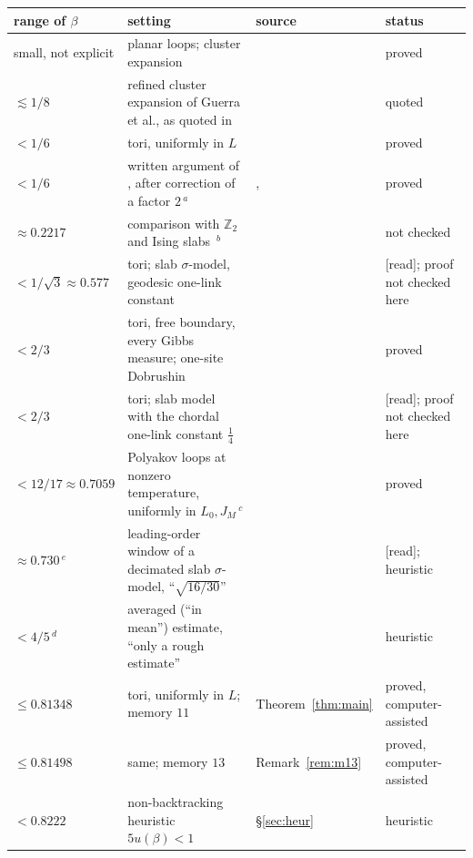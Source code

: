 \documentclass[11pt,a4paper]{article}
\theoremstyle{plain}
\theoremstyle{remark}
\numberwithin{equation}{section}
\newcommand{\Z}{\mathbb{Z}}
\newcommand{\st}[1]{\textsf{[#1]}}
\begin{document}
\begin{table}[ht]
\centering\footnotesize
\begin{tabular}{@{}>{\raggedright\arraybackslash}p{}>{\raggedright\arraybackslash}p{}%
>{\raggedright\arraybackslash}p{}>{\raggedright\arraybackslash}p{}@{}}
\toprule
range of $\beta$ & setting & source & status \\
\midrule
small, not explicit & planar loops; cluster expansion & \cite[Thm.~5.1]{OS78} & proved \\
$\lesssim1/8$ & refined cluster expansion of Guerra et al., as quoted in \cite{BS83} & \cite[p.~343]{BS83} & quoted \\
$<1/6$ & tori, uniformly in $L$ & \cite[Thm.~1.6]{CNS25} & proved \\
$<1/6$ & written argument of \cite{DF80}, after correction of a factor $2$\,$^{a}$ & \cite{DF80}, \cite[\S7.2]{D7} & proved \\
$\approx0.2217$ & comparison with $\Z_2$ and Ising slabs \cite{Fro79}\,$^{b}$ & \cite[\S7.2]{D7} & not checked \\
$<1/\sqrt3\approx0.577$ & tori; slab $\sigma$-model, geodesic one-link constant & \cite[Part~I, Cor.~6.5]{Raj26a} & \st{read}; proof not checked here \\
$<2/3$ & tori, free boundary, every Gibbs measure; one-site Dobrushin & \cite[Thm.~7.1]{D7} & proved \\
$<2/3$ & tori; slab model with the chordal one-link constant $\frac14$ & \cite[Part~II, Cor.~7.7(iii)]{Raj26a} & \st{read}; proof not checked here \\
$<12/17\approx0.7059$ & Polyakov loops at nonzero temperature, uniformly in $L_0,J_M$\,$^{c}$ & \cite[(II.55), p.~343; App.~B, pp.~373--377]{BS83} & proved \\
$\approx0.730$\,$^{e}$ & leading-order window of a decimated slab $\sigma$-model, ``$\sqrt{16/30}$'' & \cite[\S8, item (iv)]{Raj26b} & \st{read}; heuristic \\
$<4/5$\,$^{d}$ & averaged (``in mean'') estimate, ``only a rough estimate'' & \cite{Fro80a,Fro80b} & heuristic \\
$\le0.81348$ & tori, uniformly in $L$; memory $11$ & Theorem~\ref{thm:main} & proved, computer-assisted \\
$\le0.81498$ & same; memory $13$ & Remark~\ref{rem:m13} & proved, computer-assisted \\
$<0.8222$ & non-backtracking heuristic $5u(\beta)<1$ & \S\ref{sec:heur} & heuristic \\

\end{tabular}
\end{table}
\end{document}
